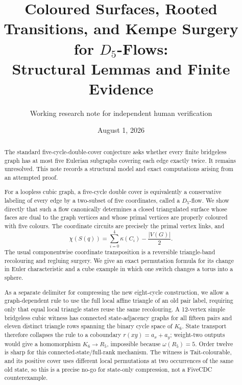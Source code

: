 \documentclass[11pt]{article}
\title{Coloured Surfaces, Rooted Transitions, and Kempe Surgery for
\(D_5\)-Flows:\\Structural Lemmas and Finite Evidence}
\author{Working research note for independent human verification}
\date{August 1, 2026}
\theoremstyle{definition}
\theoremstyle{remark}
\newcommand{\kap}{\kappa}
\begin{document}
\maketitle

\begin{abstract}
The standard five-cycle-double-cover conjecture asks whether every finite
bridgeless graph has at most five Eulerian subgraphs covering each edge
exactly twice.  It remains unresolved.  This note records a structural
model and exact computations arising from an attempted proof.

For a loopless cubic graph, a five-cycle double cover is equivalently a
conservative labeling of every edge by a two-subset of five coordinates,
called a \(D_5\)-flow.  We show directly that such a flow canonically
determines a closed triangulated surface whose faces are dual to the graph
vertices and whose primal vertices are properly coloured with five
colours.  The coordinate circuits are precisely the primal vertex links,
and
\[
 \chi(S(q))=\sum_{i=0}^{4}\kap(C_i)-\frac{|V(G)|}{2}.
\]
The usual componentwise coordinate transposition is a reversible
triangle-band recolouring and regluing surgery.  We give an exact
permutation formula for its change in Euler characteristic and a cube
example in which one switch changes a torus into a sphere.

As a separate delimiter for compressing the new eight-cycle construction,
we allow a graph-dependent rule to use the full local affine triangle of
an old pair label, requiring only that equal local triangle states reuse
the same recolouring.  A 12-vertex simple bridgeless cubic witness has
connected state-adjacency graphs for all fifteen pairs and eleven distinct
triangle rows spanning the binary cycle space of \(K_6\).  State transport
therefore collapses the rule to a coboundary \(r(xy)=a_x+a_y\); weight-two
outputs would give a homomorphism \(K_6\to R_5\), impossible because
\(\omega(R_5)=5\).  Order twelve is sharp for this connected-state/full-rank
mechanism.  The witness is Tait-colourable, and its positive cover uses
different local permutations at two occurrences of the same old state, so
this is a precise no-go for state-only compression, not a FiveCDC
counterexample.


\end{abstract}
\end{document}
